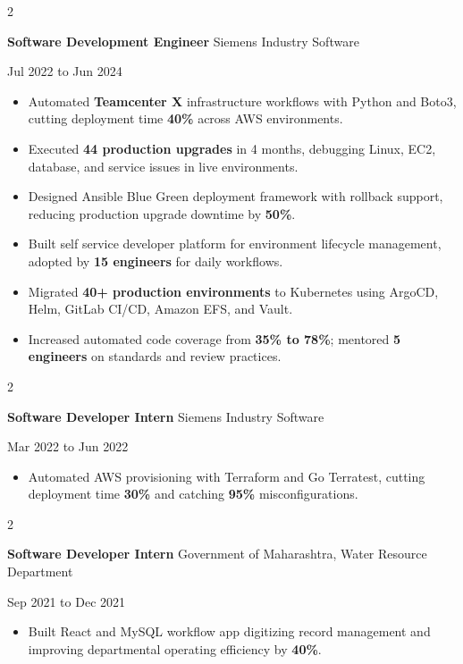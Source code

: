 \documentclass[10pt, letterpaper]{article}
\newenvironment{highlights}{
    \begin{itemize}[
        topsep=0.10 cm,
        parsep=0.06 cm,
        partopsep=0pt,
        itemsep=0.06 cm,
        leftmargin=12pt
    ]
}{
    \end{itemize}
}
\newenvironment{twocolentry}[2][]{
    \onecolentry
    \def\secondColumn{#2}
    \setcolumnwidth{\fill, 4.5 cm}
    \begin{paracol}{2}
}{
    \switchcolumn \raggedleft \secondColumn
    \end{paracol}
    \endonecolentry
}
\begin{document}
\begin{twocolentry}{Jul 2022 to Jun 2024}
\textbf{Software Development Engineer} \textbar{} Siemens Industry Software
\end{twocolentry}
\begin{highlights}
  \item Automated \textbf{Teamcenter X} infrastructure workflows with Python and Boto3, cutting deployment time \textbf{40\%} across AWS environments.
  \item Executed \textbf{44 production upgrades} in 4 months, debugging Linux, EC2, database, and service issues in live environments.
  \item Designed Ansible Blue Green deployment framework with rollback support, reducing production upgrade downtime by \textbf{50\%}.
  \item Built self service developer platform for environment lifecycle management, adopted by \textbf{15 engineers} for daily workflows.
  \item Migrated \textbf{40+ production environments} to Kubernetes using ArgoCD, Helm, GitLab CI/CD, Amazon EFS, and Vault.
  \item Increased automated code coverage from \textbf{35\% to 78\%}; mentored \textbf{5 engineers} on standards and review practices.
\end{highlights}

\vspace{0.15 cm}

\begin{twocolentry}{Mar 2022 to Jun 2022}
\textbf{Software Developer Intern} \textbar{} Siemens Industry Software
\end{twocolentry}
\begin{highlights}
  \item Automated AWS provisioning with Terraform and Go Terratest, cutting deployment time \textbf{30\%} and catching \textbf{95\%} misconfigurations.
\end{highlights}

\vspace{0.15 cm}

\begin{twocolentry}{Sep 2021 to Dec 2021}
\textbf{Software Developer Intern} \textbar{} Government of Maharashtra, Water Resource Department
\end{twocolentry}
\begin{highlights}
  \item Built React and MySQL workflow app digitizing record management and improving departmental operating efficiency by \textbf{40\%}.
\end{highlights}
\end{document}
